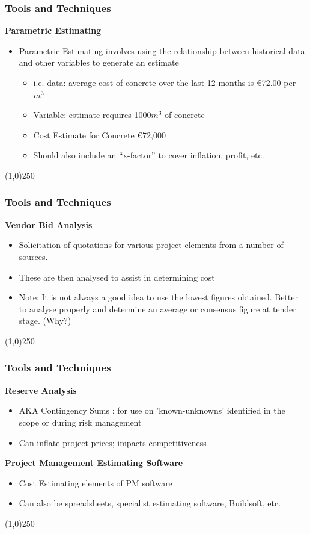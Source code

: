 \begin{frame}
\frametitle{Tools and Techniques}
\textbf{Parametric Estimating}
\begin{itemize}
	\item Parametric Estimating involves using the relationship between historical data and other variables to generate an estimate
	\begin{itemize}
		\item i.e. data: average cost of concrete over the last 12 months is \euro72.00 per $m^{3}$
		\item Variable: estimate requires 1000$m^{3}$ of concrete
		\item Cost Estimate for Concrete \euro72,000
		\item Should also include an ``x-factor'' to cover inflation, profit, etc.
	\end{itemize}
\end{itemize}

\end{frame}
\begin{center}\line(1,0){250}\end{center}



\begin{frame}
\frametitle{Tools and Techniques}
 
\textbf{Vendor Bid Analysis}
	\begin{itemize}
		\item Solicitation of quotations for various project elements from a number of sources.
		\item These are then analysed to assist in determining cost
		\item Note: It is not always a good idea to use the lowest figures obtained.  Better to analyse properly and determine an average or consensus figure at tender stage. (Why?)
	\end{itemize}
\end{frame}
\begin{center}\line(1,0){250}\end{center}


\begin{frame}
\frametitle{Tools and Techniques}
\textbf{Reserve Analysis}
\begin{itemize}
	\item AKA Contingency Sums : for use on 'known-unknowns' identified in the scope or during risk management
	\item Can inflate project prices; impacts competitiveness
\end{itemize}
\textbf{Project Management Estimating Software}
\begin{itemize}
	\item Cost Estimating elements of PM software
	\item Can also be spreadsheets, specialist estimating software, Buildsoft, etc. 
\end{itemize}
\end{frame}
\begin{center}\line(1,0){250}\end{center}






